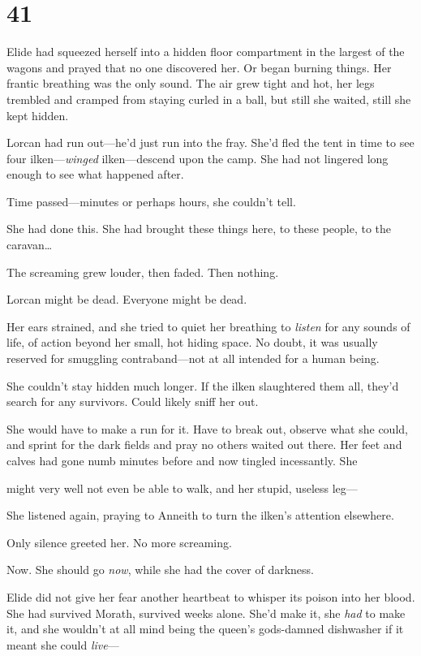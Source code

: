 
\chapter{41}

Elide had squeezed herself into a hidden floor compartment in the largest of the wagons and prayed that no one discovered her. Or began burning things. Her frantic breathing was the only sound. The air grew tight and hot, her legs trembled and cramped from staying curled in a ball, but still she waited, still she kept hidden.

Lorcan had run out---he'd just run into the fray. She'd fled the tent in time to see four ilken---\emph{winged} ilken---descend upon the camp. She had not lingered long enough to see what happened after.

Time passed---minutes or perhaps hours, she couldn't tell.

She had done this. She had brought these things here, to these people, to the caravan\ldots{}

The screaming grew louder, then faded. Then nothing.

Lorcan might be dead. Everyone might be dead.

Her ears strained, and she tried to quiet her breathing to \emph{listen}
for any sounds of life, of action beyond her small, hot hiding space. No doubt, it was usually reserved for smuggling contraband---not at all intended for a human being.

She couldn't stay hidden much longer. If the ilken slaughtered them all, they'd search for any survivors. Could likely sniff her out.

She would have to make a run for it. Have to break out, observe what she could, and sprint for the dark fields and pray no others waited out there. Her feet and calves had gone numb minutes before and now tingled incessantly. She

might very well not even be able to walk, and her stupid, useless leg---

She listened again, praying to Anneith to turn the ilken's attention elsewhere.

Only silence greeted her. No more screaming.

Now. She should go \emph{now}, while she had the cover of darkness.

Elide did not give her fear another heartbeat to whisper its poison into her blood. She had survived Morath, survived weeks alone. She'd make it, she \emph{had} to make it, and she wouldn't at all mind being the queen's gods-damned dishwasher if it meant she could \emph{live}---

